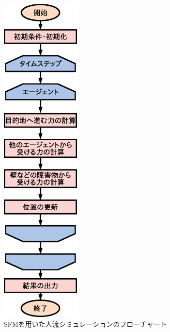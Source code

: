 \begin{figure}[hbtp]
 \begin{center}
  \includegraphics[width=4cm,clip]{figure/sfm_flowchart.eps}
  \caption{SFMを用いた人流シミュレーションのフローチャート}
  \label{fig:sfm_flowchart}
 \end{center}
\end{figure}


\newpage
